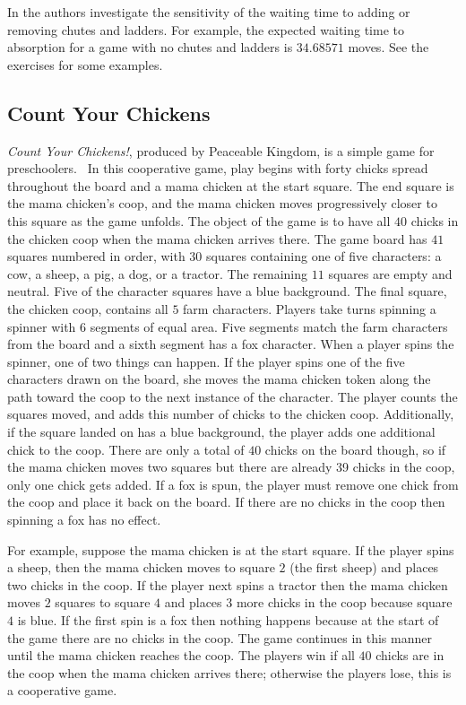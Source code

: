 \documentclass[12pt]{article}
\begin{document}
In
\cite{althoen93} the authors investigate the sensitivity of the waiting
time to adding or removing chutes and ladders.  For example, the
expected waiting time to absorption for a game with no chutes and
ladders is \( 34.68571 \) moves.  See the exercises for some examples.

\subsection*{Count Your Chickens}

\emph{Count Your Chickens!}, produced by Peaceable Kingdom, is a simple
game for preschoolers.~%
In this cooperative game, play begins with forty chicks spread
throughout the board and a mama chicken at the start square.  The end
square is the mama chicken's coop, and the mama chicken moves
progressively closer to this square as the game unfolds.  The object of
the game is to have all \( 40 \) chicks in the chicken coop when the
mama chicken arrives there.  The game board has \( 41 \) squares
numbered in order, with \( 30 \) squares containing one of five
characters:  a cow, a sheep, a pig, a dog, or a tractor.  The remaining \(
11 \) squares are empty and neutral.  Five of the character squares have
a blue background.  The final square, the chicken coop, contains all \(
5 \) farm characters.  Players take turns spinning a spinner with 6
segments of equal area.  Five segments match the farm characters from
the board and a sixth segment has a fox character.  When a player spins
the spinner, one of two things can happen.  If the player spins one of
the five characters drawn on the board, she moves the mama chicken token
along the path toward the coop to the next instance of the character.
The player counts the squares moved, and adds this number of chicks to
the chicken coop.  Additionally, if the square landed on has a blue
background, the player adds one additional chick to the coop.  There are
only a total of \( 40 \) chicks on the board though, so if the mama
chicken moves two squares but there are already 39 chicks in the coop,
only one chick gets added.  If a fox is spun, the player must remove one
chick from the coop and place it back on the board.  If there are no
chicks in the coop then spinning a fox has no effect.

For example, suppose the mama chicken is at the start square.  If the
player spins a sheep, then the mama chicken moves to square \( 2 \) (the
first sheep) and places two chicks in the coop.  If the player next
spins a tractor then the mama chicken moves \( 2 \) squares to square \(
4 \) and places \( 3 \) more chicks in the coop because square \( 4 \)
is blue.  If the first spin is a fox then nothing happens because at the
start of the game there are no chicks in the coop.  The game continues
in this manner until the mama chicken reaches the coop.  The players win
if all \( 40 \) chicks are in the coop when the mama chicken arrives
there; otherwise the players lose, this is a cooperative game.
\end{document}
